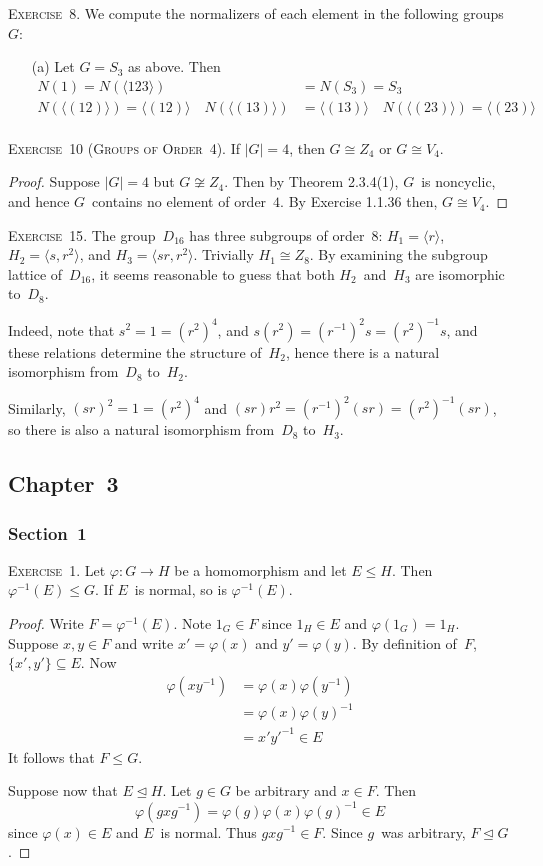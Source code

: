 \documentclass[letterpaper]{article}
\newcommand{\exercise}[1]{\goodbreak\noindent\textsc{Exercise~{#1}.}}
\newcommand{\iso}{\cong}
\newcommand{\subgroup}{\le}
\newcommand{\normal}{\trianglelefteq}
\newcommand{\ord}[1]{|{#1}|}
\newcommand{\gen}[1]{\langle{#1}\rangle}
\begin{document}
\exercise{8}
We compute the normalizers of each element in the following groups~$G$:
\begin{enumerate}[itemsep=0pt]
\item[(a)] Let $G=S_3$ as above. Then
\begin{align*}
N(1)=N(\gen{123})&=N(S_3)=S_3\\
N(\gen{(12)})=\gen{(12)}\quad N(\gen{(13)})&=\gen{(13)}\quad N(\gen{(23)})=\gen{(23)}\\
\end{align*}
\end{enumerate}

\exercise{10 (Groups of Order~4)}
If $\ord{G}=4$, then $G\iso Z_4$ or $G\iso V_4$.
\begin{proof}
Suppose $\ord{G}=4$ but $G\not\iso Z_4$. Then by Theorem 2.3.4(1), $G$~is noncyclic, and hence $G$~contains no element of order~$4$. By Exercise 1.1.36 then, $G\iso V_4$.
\end{proof}

\exercise{15}
The group~$D_{16}$ has three subgroups of order~$8$: $H_1=\gen{r}$, $H_2=\gen{s,r^2}$, and $H_3=\gen{sr,r^2}$. Trivially $H_1\iso Z_8$. By examining the subgroup lattice of~$D_{16}$, it seems reasonable to guess that both $H_2$~and~$H_3$ are isomorphic to~$D_8$.

Indeed, note that $s^2=1=(r^2)^4$, and $s(r^2)=(r^{-1})^2s=(r^2)^{-1}s$, and these relations determine the structure of~$H_2$, hence there is a natural isomorphism from~$D_8$ to~$H_2$.

Similarly, $(sr)^2=1=(r^2)^4$ and $(sr)r^2=(r^{-1})^2(sr)=(r^2)^{-1}(sr)$, so there is also a natural isomorphism from~$D_8$ to~$H_3$.

\subsection*{Chapter~3}
\subsubsection*{Section~1}

\exercise{1}
Let $\varphi:G\to H$ be a homomorphism and let $E\subgroup H$. Then $\varphi^{-1}(E)\subgroup G$. If $E$~is normal, so is $\varphi^{-1}(E)$.
\begin{proof}
Write $F=\varphi^{-1}(E)$. Note $1_G\in F$ since $1_H\in E$ and $\varphi(1_G)=1_H$. Suppose $x,y\in F$ and write $x'=\varphi(x)$ and $y'=\varphi(y)$. By definition of~$F$, $\{x',y'\}\subseteq E$. Now
\begin{align*}
\varphi(xy^{-1})&=\varphi(x)\varphi(y^{-1})\\
	&=\varphi(x)\varphi(y)^{-1}\\
	&=x'y'^{-1}\in E
\end{align*}
It follows that $F\subgroup G$.

Suppose now that $E\normal H$. Let $g\in G$ be arbitrary and $x\in F$. Then
$$\varphi(gxg^{-1})=\varphi(g)\varphi(x)\varphi(g)^{-1}\in E$$
since $\varphi(x)\in E$ and $E$~is normal. Thus $gxg^{-1}\in F$. Since $g$~was arbitrary, $F\normal G$.
\end{proof}
\end{document}
